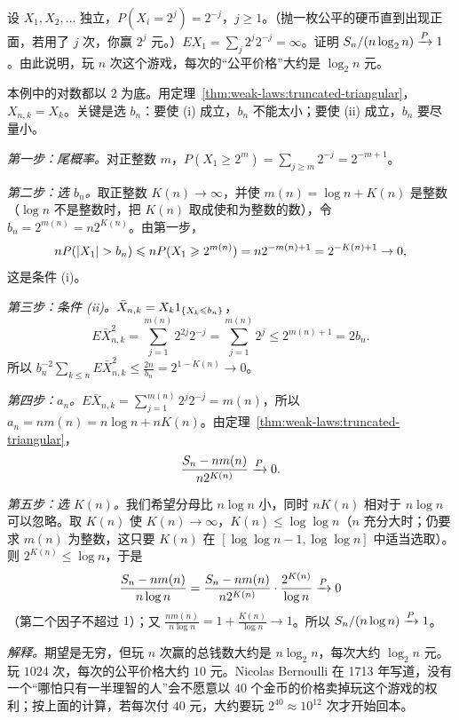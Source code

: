 \begin{workedexample}[St.\ Petersburg 悖论]\label{we:weak-laws:st-petersburg}
设 $X_1,X_2,\dots$ 独立，$P(X_i=2^j)=2^{-j}$，$j\geqslant1$。（抛一枚公平的硬币直到出现正面，若用了 $j$ 次，你赢 $2^j$ 元。）$EX_1=\sum_j2^j2^{-j}=\infty$。证明 $S_n/(n\log_2n)\xrightarrow{P}1$。由此说明，玩 $n$ 次这个游戏，每次的“公平价格”大约是 $\log_2n$ 元。
\end{workedexample}
\begin{solution}
本例中的对数都以 $2$ 为底。用定理~\ref{thm:weak-laws:truncated-triangular}，$X_{n,k}=X_k$。关键是选 $b_n$：要使 (i) 成立，$b_n$ 不能太小；要使 (ii) 成立，$b_n$ 要尽量小。

\emph{第一步：尾概率。}对正整数 $m$，$P(X_1\geqslant2^m)=\sum_{j\geqslant m}2^{-j}=2^{-m+1}$。

\emph{第二步：选 $b_n$。}取正整数 $K(n)\to\infty$，并使 $m(n)=\log n+K(n)$ 是整数（$\log n$ 不是整数时，把 $K(n)$ 取成使和为整数的数），令 $b_n=2^{m(n)}=n2^{K(n)}$。由第一步，
\[
nP(\lvert X_1\rvert>b_n)\leqslant nP(X_1\geqslant2^{m(n)})=n2^{-m(n)+1}=2^{-K(n)+1}\to0,
\]
这是条件 (i)。

\emph{第三步：条件 (ii)。}$\bar X_{n,k}=X_k1_{\{X_k\leqslant b_n\}}$，
\[
E\bar X_{n,k}^2=\sum_{j=1}^{m(n)}2^{2j}2^{-j}=\sum_{j=1}^{m(n)}2^j\leqslant2^{m(n)+1}=2b_n .
\]
所以 $b_n^{-2}\sum_{k\leqslant n}E\bar X_{n,k}^2\leqslant\frac{2n}{b_n}=2^{1-K(n)}\to0$。

\emph{第四步：$a_n$。}$E\bar X_{n,k}=\sum_{j=1}^{m(n)}2^j2^{-j}=m(n)$，所以 $a_n=nm(n)=n\log n+nK(n)$。由定理~\ref{thm:weak-laws:truncated-triangular}，
\[
\frac{S_n-nm(n)}{n2^{K(n)}}\xrightarrow{P}0 .
\]

\emph{第五步：选 $K(n)$。}我们希望分母比 $n\log n$ 小，同时 $nK(n)$ 相对于 $n\log n$ 可以忽略。取 $K(n)$ 使 $K(n)\to\infty$，$K(n)\leqslant\log\log n$（$n$ 充分大时；仍要求 $m(n)$ 为整数，这只要 $K(n)$ 在 $[\log\log n-1,\log\log n]$ 中适当选取）。则 $2^{K(n)}\leqslant\log n$，于是
\[
\frac{S_n-nm(n)}{n\log n}=\frac{S_n-nm(n)}{n2^{K(n)}}\cdot\frac{2^{K(n)}}{\log n}\xrightarrow{P}0
\]
（第二个因子不超过 $1$）；又 $\frac{nm(n)}{n\log n}=1+\frac{K(n)}{\log n}\to1$。所以 $S_n/(n\log n)\xrightarrow{P}1$。

\emph{解释。}期望是无穷，但玩 $n$ 次赢的总钱数大约是 $n\log_2n$，每次大约 $\log_2n$ 元。玩 $1024$ 次，每次的公平价格大约 $10$ 元。Nicolas Bernoulli 在 1713 年写道，没有一个“哪怕只有一半理智的人”会不愿意以 $40$ 个金币的价格卖掉玩这个游戏的权利；按上面的计算，若每次付 $40$ 元，大约要玩 $2^{40}\approx10^{12}$ 次才开始回本。
\end{solution}


